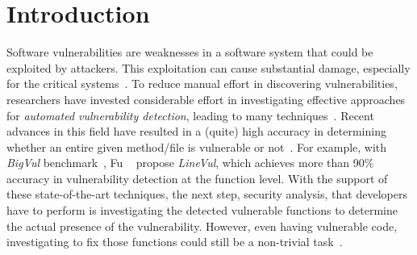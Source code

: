 \section{Introduction}
Software vulnerabilities are weaknesses in a software system that could be exploited by attackers. This exploitation can cause substantial damage, especially for the critical systems~\citep{survey_3}.
%
To reduce manual effort in discovering vulnerabilities, researchers have invested considerable effort in investigating effective approaches for \textit{automated vulnerability detection}, leading to many techniques~\citep{linevd,linevul,ivdetect,vuldeeppeaker,sysevr,velvet,poster,vulsniper,devign,are_we_there,cheng2022path}. 
%
Recent advances in this field have resulted in a (quite) high accuracy in determining whether an entire given method/file is vulnerable or not~\cite{linevul,vuldeeppeaker,sysevr,velvet,poster}. For example, with \textit{BigVul} benchmark~\cite{bigvul}, Fu \etal~\cite{linevul} propose \textit{LineVul}, which achieves more than 90\% accuracy in vulnerability detection at the function level.
%
With the support of these state-of-the-art techniques, the next step, security analysis, that developers have to perform is investigating the detected vulnerable functions to determine the actual presence of the vulnerability. 
%
%
However, even having vulnerable code, investigating to fix those functions could still be a non-trivial task~\cite{vul_secret,openai_fixing,transfer_learning_for_fixing}. 
%





